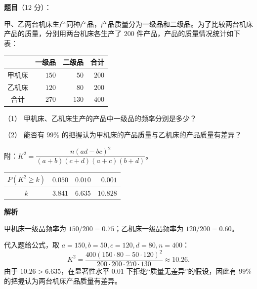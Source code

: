 \begin{answer}

\textbf{题目}（12 分）：

甲、乙两台机床生产同种产品，产品质量分为一级品和二级品。为了比较两台机床产品的质量，分别用两台机床各生产了 $200$ 件产品，产品的质量情况统计如下表：

\begin{center}
\begin{tabular}{crrr}
\toprule
 & 一级品 & 二级品 & 合计 \\
\midrule
甲机床 & $150$ & $50$ & $200$ \\
乙机床 & $120$ & $80$ & $200$ \\
合计 & $270$ & $130$ & $400$ \\
\bottomrule
\end{tabular}
\end{center}

（1） 甲机床、乙机床生产的产品中一级品的频率分别是多少？

（2） 能否有 $99\%$ 的把握认为甲机床的产品质量与乙机床的产品质量有差异？

附：$K^2=\dfrac{n(ad-bc)^2}{(a+b)(c+d)(a+c)(b+d)}$。

\begin{center}
\begin{tabular}{crrr}
\toprule
$P(K^2\geqslant k)$ & $0.050$ & $0.010$ & $0.001$ \\
\midrule
$k$ & $3.841$ & $6.635$ & $10.828$ \\
\bottomrule
\end{tabular}
\end{center}

\textbf{解析}


甲机床一级品频率为 $150/200=0.75$；乙机床一级品频率为 $120/200=0.60$。


代入题给公式，取 $a=150,b=50,c=120,d=80,n=400$：
\nopagebreak[4]
\[
K^2=\frac{400(150\cdot80-50\cdot120)^2}{200\cdot200\cdot270\cdot130}
\approx10.26.
\]
由于 $10.26>6.635$，在显著性水平 $0.01$ 下拒绝“质量无差异”的假设，因此有 $99\%$ 的把握认为两台机床产品质量有差异。



\end{answer}
